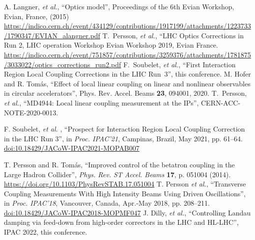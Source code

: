 \documentclass[a4paper]{cernatsnote}
\begin{document}
\begin{thebibliography}{99}
 A. Langner, {\it et al.}, “Optics model”, Proceedings of the 6th Evian Workshop,
Evian, France, (2015) \url{https://indico.cern.ch/event/434129/contributions/1917199/attachments/1223733/1790347/EVIAN_alangner.pdf}
%
T.~Persson, {\it et al.}, ``LHC Optics Corrections in Run 2, LHC operation Workshop Evian Workshop 2019, Evian France.
\url{https://indico.cern.ch/event/751857/contributions/3259376/attachments/1781875/3033022/optics_corrections_run2.pdf}
%
 F.~Soubelet, {\it et al.}, ``First Interaction Region Local Coupling Corrections in the LHC Run~3'', this conference.
%
 M. Hofer and R. Tom\'as, ``Effect of local linear coupling on linear and nonlinear observables in circular accelerators'',
Phys. Rev. Accel. Beams {\bf23}, 094001, 2020.
%
 T.~Persson, {\it et al.}, ``MD4944: Local linear coupling measurement at the IPs'', CERN-ACC-NOTE-2020-0013.

   F. Soubelet,  {\it et al.} ,
   \textquotedblleft{Prospect for Interaction Region Local Coupling Correction in the LHC Run 3}\textquotedblright,
   in \emph{Proc. IPAC’21}, Campinas, Brazil, May 2021, pp. 61--64.
   \url{doi:10.18429/JACoW-IPAC2021-MOPAB007}  

 T. Persson and R. Tom\'as, ``Improved control of the betatron coupling in the Large Hadron Collider'',
{\it Phys. Rev. ST Accel. Beams} {\bf 17}, p. 051004 (2014).
\url{https://doi.org/10.1103/PhysRevSTAB.17.051004}
%
    T. Persson \emph{et al.},
   \textquotedblleft{Transverse Coupling Measurements With High Intensity Beams Using Driven Oscillations}\textquotedblright,
   in \emph{Proc. IPAC’18}, Vancouver, Canada, Apr.-May 2018, pp. 208--211.
   \url{doi:10.18429/JACoW-IPAC2018-MOPMF047}    
%
 J. Dilly, {\it et al.}, ``Controlling Landau damping via feed-down from high-order correctors in the LHC and HL-LHC'', IPAC 2022, this conference.

\end{thebibliography}
\appendix
\end{document}
